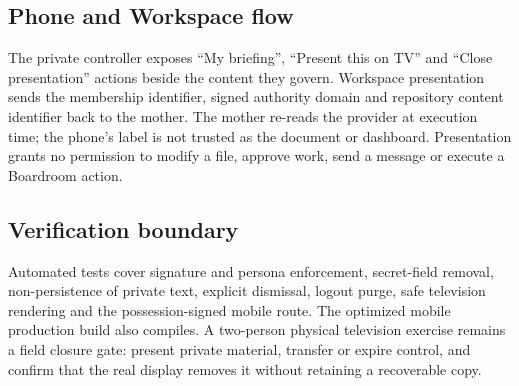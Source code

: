 \subsection{Phone and Workspace flow}

The private controller exposes ``My briefing'', ``Present this on TV'' and ``Close
presentation'' actions beside the content they govern.  Workspace presentation sends
the membership identifier, signed authority domain and repository content identifier
back to the mother.  The mother re-reads the provider at execution time; the phone's
label is not trusted as the document or dashboard.  Presentation grants no permission
to modify a file, approve work, send a message or execute a Boardroom action.

\subsection{Verification boundary}

Automated tests cover signature and persona enforcement, secret-field removal,
non-persistence of private text, explicit dismissal, logout purge, safe television
rendering and the possession-signed mobile route.  The optimized mobile production
build also compiles.  A two-person physical television exercise remains a field
closure gate: present private material, transfer or expire control, and confirm that
the real display removes it without retaining a recoverable copy.

